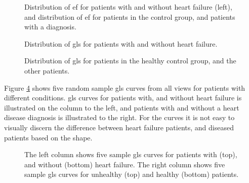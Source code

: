 \begin{figure}
    \centering
    
    \caption{Distribution of \acrshort{ef} for patients with and without heart failure (left), and distribution of \acrshort{ef} for patients in the control group, and patients with a diagnosis.}
    \label{fig:ef_hf_ind_dist}
\end{figure}

\begin{figure}
    \centering
    
    \caption{Distribution of \acrshort{gls} for patients with and without heart failure.}
    \label{fig:gls_hf_dist}
\end{figure}

\begin{figure}
    \centering
    
    \caption{Distribution of \acrshort{gls} for patients in the healthy control group, and the other patients.}
    \label{fig:gls_ind_dist}
\end{figure}

\clearpage

Figure \ref{fig:gls_curves_vs_hf_and_ind} shows five random sample \acrshort{gls} curves from all views for patients with different conditions. \acrshort{gls} curves for patients with, and without heart failure is illustrated on the column to the left, and patients with and without a heart disease diagnosis is illustrated to the right. For the curves it is not easy to visually discern the difference between heart failure patients, and diseased patients based on the shape.

\begin{figure}
    \centering
    
    \caption{The left column shows five sample \acrshort{gls} curves for patients with (top), and without (bottom) heart failure. The right column shows five sample \acrshort{gls} curves for unhealthy (top) and healthy (bottom) patients.}
    \label{fig:gls_curves_vs_hf_and_ind}
\end{figure}

\clearpage

